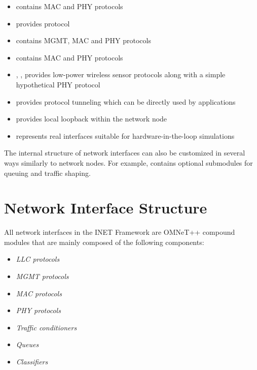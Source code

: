 \begin{itemize}
        \item {} contains  MAC and PHY protocols
        \item {} provides  protocol
        \item {} contains  MGMT, MAC and PHY protocols
        \item {} contains  MAC and PHY protocols
        \item {}, ,  provides low-power wireless sensor protocols along with a simple hypothetical PHY protocol
        \item {} provides protocol tunneling which can be directly used by applications
        \item {} provides local loopback within the network node
        \item {} represents real interfaces suitable for hardware-in-the-loop simulations
\end{itemize}

The internal structure of network interfaces can also be customized in
several ways similarly to network nodes. For example,
 contains optional submodules for queuing and
traffic shaping.

\section{Network Interface Structure}

All network interfaces in the INET Framework are OMNeT++ compound modules that
are mainly composed of the following components:

\begin{itemize}
        \item \emph{LLC protocols}
        \item \emph{MGMT protocols}
        \item \emph{MAC protocols}
        \item \emph{PHY protocols}
        \item \emph{Traffic conditioners}
        \item \emph{Queues}
        \item \emph{Classifiers}
\end{itemize}

